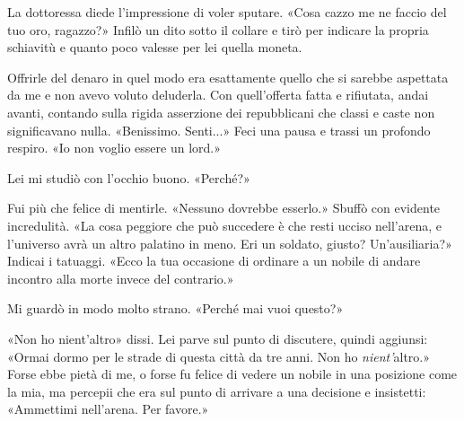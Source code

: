La dottoressa diede l'impressione di voler sputare. «Cosa cazzo me ne
faccio del tuo oro, ragazzo?» Infilò un dito sotto il collare e tirò per
indicare la propria schiavitù e quanto poco valesse per lei quella
moneta.

Offrirle del denaro in quel modo era esattamente quello che si sarebbe
aspettata da me e non avevo voluto deluderla. Con quell'offerta fatta e
rifiutata, andai avanti, contando sulla rigida asserzione dei
repubblicani che classi e caste non significavano nulla. «Benissimo.
Senti...» Feci una pausa e trassi un profondo respiro. «Io non voglio
essere un lord.»

Lei mi studiò con l'occhio buono. «Perché?»

Fui più che felice di mentirle. «Nessuno dovrebbe esserlo.» Sbuffò con
evidente incredulità. «La cosa peggiore che può succedere è che resti
ucciso nell'arena, e l'universo avrà un altro palatino in meno. Eri un
soldato, giusto? Un'ausiliaria?» Indicai i tatuaggi. «Ecco la tua
occasione di ordinare a un nobile di andare incontro alla morte invece
del contrario.»

Mi guardò in modo molto strano. «Perché mai vuoi questo?»

«Non ho nient'altro» dissi. Lei parve sul punto di discutere, quindi
aggiunsi: «Ormai dormo per le strade di questa città da tre anni. Non ho
\emph{nient'}altro.» Forse ebbe pietà di me, o forse fu felice di vedere
un nobile in una posizione come la mia, ma percepii che era sul punto di
arrivare a una decisione e insistetti: «Ammettimi nell'arena. Per
favore.»

